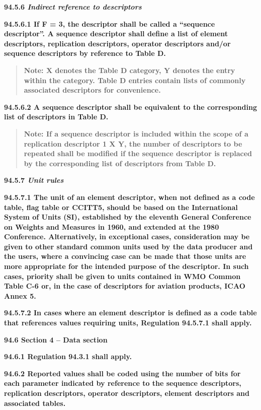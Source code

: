 \textbf{94.5.6 \emph{Indirect reference to descriptors}}

\textbf{94.5.6.1 If F = 3, the descriptor shall be called a ``sequence descriptor''. A sequence descriptor shall define a list of element descriptors, replication descriptors, operator descriptors and/or sequence descriptors by reference to Table D.}

\begin{quote}
\textbf{Note: X denotes the Table D category, Y denotes the entry within the category. Table D entries contain lists of commonly associated descriptors for convenience.}
\end{quote}

\textbf{94.5.6.2 A sequence descriptor shall be equivalent to the corresponding list of descriptors in Table D.}

\begin{quote}
\textbf{Note: If a sequence descriptor is included within the scope of a replication descriptor 1 X Y, the number of descriptors to be repeated shall be modified if the sequence descriptor is replaced by the corresponding list of descriptors from Table D.}
\end{quote}

\textbf{94.5.7 \emph{Unit rules}}

\textbf{94.5.7.1 The unit of an element descriptor, when not defined as a code table, flag table or CCITT5, should be based on the International System of Units (SI), established by the eleventh General Conference on Weights and Measures in 1960, and extended at the 1980 Conference. Alternatively, in exceptional cases, consideration may be given to other standard common units used by the data producer and the users, where a convincing case can be made that those units are more appropriate for the intended purpose of the descriptor. In such cases, priority shall be given to units contained in WMO Common Table C-6 or, in the case of descriptors for aviation products, ICAO Annex 5.}

\textbf{94.5.7.2 In cases where an element descriptor is defined as a code table that references values requiring units, Regulation 94.5.7.1 shall apply.}

\textbf{94.6 Section 4 -- Data section}

\textbf{94.6.1 Regulation 94.3.1 shall apply.}

\textbf{94.6.2 Reported values shall be coded using the number of bits for each parameter indicated by reference to the sequence descriptors, replication descriptors, operator descriptors, element descriptors and associated tables.}

